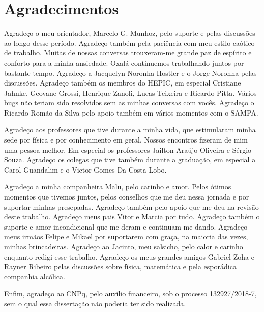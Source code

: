 \chapter*{Agradecimentos}

Agrade\c{c}o o meu orientador, Marcelo G. Munhoz, pelo suporte e pelas discuss\~{o}es ao longo desse per\'{i}odo. Agrade\c{c}o tamb\'{e}m pela paci\^{e}ncia com meu estilo ca\'{o}tico de trabalho. Muitas de nossas conversas trouxeram-me grande paz de esp\'{i}rito e conforto para a minha ansiedade. Oxal\'{a} continuemos trabalhando juntos por bastante tempo. Agrade\c{c}o a Jacquelyn Noronha-Hostler e o Jorge Noronha pelas discuss\~{o}es. Agrade\c{c}o também os membros do HEPIC, em especial Cristiane Jahnke, Geovane Grossi, Henrique Zanoli, Lucas Teixeira e Ricardo Pitta. V\'{a}rios bugs n\~{a}o teriam sido resolvidos sem as minhas conversas com voc\^{e}s. Agrade\c{c}o o Ricardo Rom\~{a}o da Silva pelo apoio tamb\'{e}m em v\'{a}rios momentos com o SAMPA.

Agrade\c{c}o aos professores que tive durante a minha vida, que estimularam minha sede por f\'{i}sica e por conhecimento em geral. Nossos encontros fizeram de mim uma pessoa melhor. Em especial os professores Jailton Ara\'{u}jo Oliveira e S\'{e}rgio Souza. Agrade\c{c}o os colegas que tive tamb\'{e}m durante a gradua\c{c}\~{a}o, em especial a Carol Guandalim e o Victor Gomes Da Costa Lobo.

Agrade\c{c}o a minha companheira Malu, pelo carinho e amor. Pelos \'{o}timos momentos que tivemos juntos, pelos conselhos que me deu nessa jornada e por suportar minhas presepadas. Agrade\c{c}o tamb\'{e}m pelo apoio que me deu na revis\~{a}o deste trabalho. Agrade\c{c}o meus pais Vitor e Marcia por tudo. Agrade\c{c}o tamb\'{e}m o suporte e amor incondicional que me deram e continuam me dando. Agrade\c{c}o meus irm\~{a}os Felipe e Mikael por suportarem com gra\c{c}a, na maioria das vezes, minhas brincadeiras. Agrade\c{c}o ao Jacinto, meu salsicho, pelo calor e carinho enquanto redigi esse trabalho. Agrade\c{c}o os meus grandes amigos Gabriel Zoha e Rayner Ribeiro pelas discuss\~{o}es sobre f\'{i}sica, matem\'{a}tica e pela espor\'{a}dica companhia alc\'{o}lica.

Enfim, agrade\c{c}o ao CNPq, pelo aux\'{i}lio financeiro, sob o processo 132927/2018-7, sem o qual essa disserta\c{c}\~{a}o n\~{a}o poderia ter sido realizada.